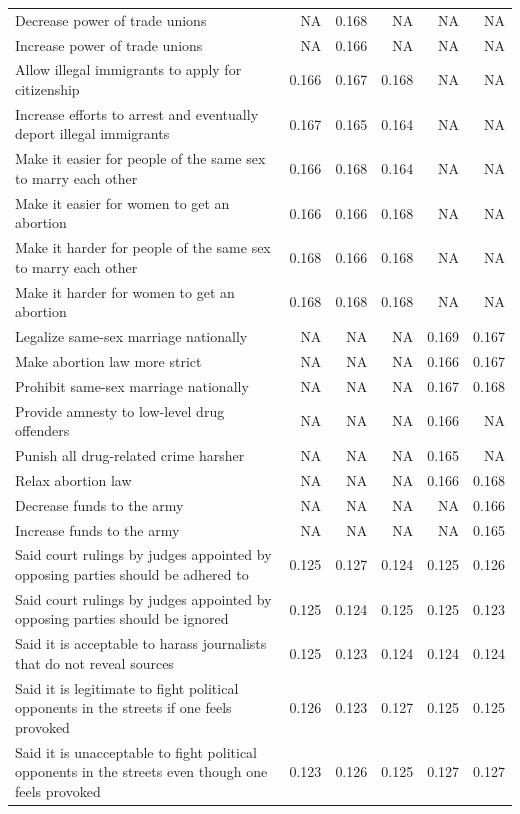 \documentclass[
  12pt,
]{article}
\begin{document}
\begin{longtable}[t]{>{\raggedright\arraybackslash}p{7cm}rrrrr}
\addlinespace
Decrease power of trade unions & NA & 0.168 & NA & NA & NA\\
Increase power of trade unions & NA & 0.166 & NA & NA & NA\\
Allow illegal immigrants to apply for citizenship & 0.166 & 0.167 & 0.168 & NA & NA\\
Increase efforts to arrest and eventually deport illegal immigrants & 0.167 & 0.165 & 0.164 & NA & NA\\
Make it easier for people of the same sex to marry each other & 0.166 & 0.168 & 0.164 & NA & NA\\
\addlinespace
Make it easier for women to get an abortion & 0.166 & 0.166 & 0.168 & NA & NA\\
Make it harder for people of the same sex to marry each other & 0.168 & 0.166 & 0.168 & NA & NA\\
Make it harder for women to get an abortion & 0.168 & 0.168 & 0.168 & NA & NA\\
Legalize same-sex marriage nationally & NA & NA & NA & 0.169 & 0.167\\
Make abortion law more strict & NA & NA & NA & 0.166 & 0.167\\
\addlinespace
Prohibit same-sex marriage nationally & NA & NA & NA & 0.167 & 0.168\\
Provide amnesty to low-level drug offenders & NA & NA & NA & 0.166 & NA\\
Punish all drug-related crime harsher & NA & NA & NA & 0.165 & NA\\
Relax abortion law & NA & NA & NA & 0.166 & 0.168\\
Decrease funds to the army & NA & NA & NA & NA & 0.166\\
\addlinespace
Increase funds to the army & NA & NA & NA & NA & 0.165\\
Said court rulings by judges appointed by opposing parties should be adhered to & 0.125 & 0.127 & 0.124 & 0.125 & 0.126\\
Said court rulings by judges appointed by opposing parties should be ignored & 0.125 & 0.124 & 0.125 & 0.125 & 0.123\\
Said it is acceptable to harass journalists that do not reveal sources & 0.125 & 0.123 & 0.124 & 0.124 & 0.124\\
Said it is legitimate to fight political opponents in the streets if one feels provoked & 0.126 & 0.123 & 0.127 & 0.125 & 0.125\\
\addlinespace
Said it is unacceptable to fight political opponents in the streets even though one feels provoked & 0.123 & 0.126 & 0.125 & 0.127 & 0.127\\

\end{longtable}
\end{document}
